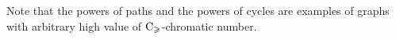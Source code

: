 \documentclass{article}
\theoremstyle{definition}
\newcommand{\mc}{\overline{\chi}_{\geqslant}}
\newcommand{\cg}{{\rm C}_{\geqslant}}
\begin{document}
Note that the powers of paths and the powers of cycles are examples of graphs with arbitrary high value of $\cg$-chromatic number.
  
    



\end{document}
